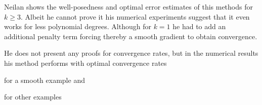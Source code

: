 Neilan shows the well-posedness and optimal error estimates of this methods for $k \geq 3$. Albeit he cannot prove it his numerical experiments suggest that it even works for less polynomial degrees. Although for $k=1$ he had to add an additional penalty term forcing thereby a smooth gradient to obtain convergence.

He does not present any proofs for convergence rates, but in the numerical results his method performs with optimal convergence rates

for a smooth example and 

for other examples 
